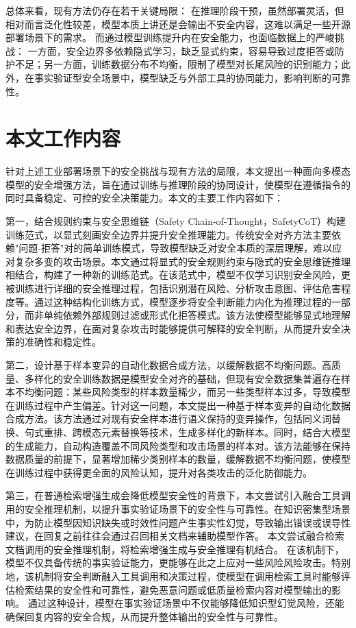 总体来看，现有方法仍存在若干关键局限：
在推理阶段干预，虽然部署灵活，但相对而言泛化性较差，模型本质上讲还是会输出不安全内容，这难以满足一些开源部署场景下的需求。
而通过模型训练提升内在安全能力，也面临数据上的严峻挑战：
一方面，安全边界多依赖隐式学习，缺乏显式约束，容易导致过度拒答或防护不足；另一方面，训练数据分布不均衡，限制了模型对长尾风险的识别能力；此外，在事实验证型安全场景中，模型缺乏与外部工具的协同能力，影响判断的可靠性。

\section{本文工作内容}

针对上述工业部署场景下的安全挑战与现有方法的局限，本文提出一种面向多模态模型的安全增强方法，旨在通过训练与推理阶段的协同设计，使模型在遵循指令的同时具备稳定、可控的安全决策能力。本文的主要工作内容如下：

第一，结合规则约束与安全思维链（Safety Chain-of-Thought，SafetyCoT）构建训练范式，以显式刻画安全边界并提升安全推理能力。传统安全对齐方法主要依赖"问题-拒答"对的简单训练模式，导致模型缺乏对安全本质的深层理解，难以应对复杂多变的攻击场景。本文通过将显式的安全规则约束与隐式的安全思维链推理相结合，构建了一种新的训练范式。在该范式中，模型不仅学习识别安全风险，更被训练进行详细的安全推理过程，包括识别潜在风险、分析攻击意图、评估危害程度等。通过这种结构化训练方式，模型逐步将安全判断能力内化为推理过程的一部分，而非单纯依赖外部规则过滤或形式化拒答模式。该方法使模型能够显式地理解和表达安全边界，在面对复杂攻击时能够提供可解释的安全判断，从而提升安全决策的准确性和稳定性。

第二，设计基于样本变异的自动化数据合成方法，以缓解数据不均衡问题。高质量、多样化的安全训练数据是模型安全对齐的基础，但现有安全数据集普遍存在样本不均衡问题：某些风险类型的样本数量稀少，而另一些类型样本过多，导致模型在训练过程中产生偏差。针对这一问题，本文提出一种基于样本变异的自动化数据合成方法。该方法通过对现有安全样本进行语义保持的变异操作，包括同义词替换、句式重排、跨模态元素替换等技术，生成多样化的新样本。同时，结合大模型的生成能力，自动构造覆盖不同风险类型和攻击场景的样本对。该方法能够在保持数据质量的前提下，显著增加稀少类别样本的数量，缓解数据不均衡问题，使模型在训练过程中获得更全面的风险认知，提升对各类攻击的泛化防御能力。

第三，在普通检索增强生成会降低模型安全性的背景下，本文尝试引入融合工具调用的安全推理机制，以提升事实验证场景下的安全性与可靠性。在知识密集型场景中，为防止模型因知识缺失或时效性问题产生事实性幻觉，导致输出错误或误导性建议，在回复之前往往会通过召回相关文档来辅助模型作答。
本文尝试融合检索文档调用的安全推理机制，将检索增强生成与安全推理有机结合。
在该机制下，模型不仅具备传统的事实验证能力，更能够在此之上应对一些风险风险攻击。特别地，该机制将安全判断融入工具调用和决策过程，使模型在调用检索工具时能够评估检索结果的安全性和可靠性，避免恶意问题或低质量检索内容对模型输出的影响。
通过这种设计，模型在事实验证场景中不仅能够降低知识型幻觉风险，还能确保回复内容的安全合规，从而提升整体输出的安全性与可靠性。

